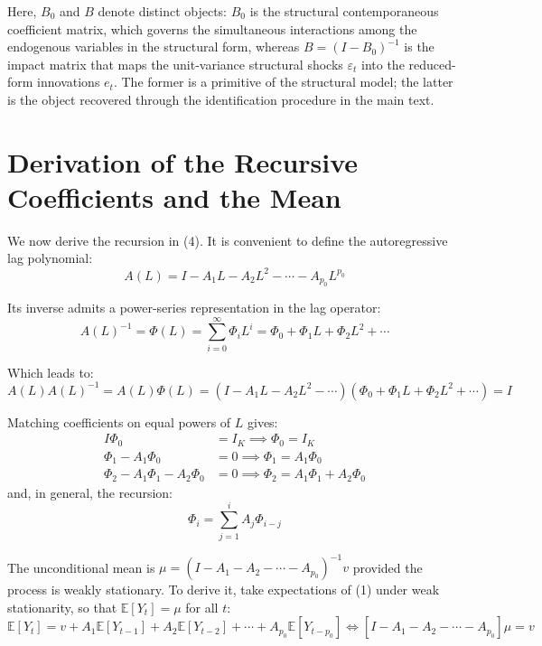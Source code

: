 \documentclass[12pt, a4paper]{article}
\begin{document}
Here, $B_0$ and $B$ denote distinct objects: $B_0$ is the structural contemporaneous coefficient matrix, which governs the simultaneous interactions among the endogenous variables in the structural form, whereas $B = (I-B_0)^{-1}$ is the impact matrix that maps the unit-variance structural shocks $\varepsilon_t$ into the reduced-form innovations $e_t$. The former is a primitive of the structural model; the latter is the object recovered through the identification procedure in the main text.

\section{Derivation of the Recursive Coefficients and the Mean}

We now derive the recursion in (4). It is convenient to define the autoregressive lag polynomial: 
\begin{equation}
A(L) = I - A_1L - A_2L^2 - \cdots - A_{p_0}L^{p_0}  
\end{equation}

Its inverse admits a power-series representation in the lag operator:
\begin{equation}
A(L)^{-1} = \Phi(L) = \sum_{i=0}^{\infty} \Phi_i L^{i} = \Phi_0 + \Phi_1L + \Phi_2L^2 + \cdots  
\end{equation}

Which leads to: 
\begin{equation}
A(L)A(L)^{-1} = A(L)\Phi(L) = (I - A_1L - A_2L^2 - \cdots)(\Phi_0 + \Phi_1L + \Phi_2L^2 + \cdots) = I  
\end{equation}

Matching coefficients on equal powers of $L$ gives: 
\begin{align*}
I\Phi_0 &= I_K \implies \Phi_0 = I_K \\
\Phi_1 - A_1\Phi_0 &= 0 \implies \Phi_1 = A_1\Phi_0 \\
\Phi_2 - A_1\Phi_1 - A_2\Phi_0 &= 0 \implies \Phi_2 = A_1\Phi_1 + A_2\Phi_0
\end{align*}
and, in general, the recursion: 
\begin{equation}
\Phi_i = \sum_{j=1}^{i} A_j\Phi_{i-j}  
\end{equation}

The unconditional mean is $\mu = (I-A_1-A_2-\cdots-A_{p_0})^{-1}v$ provided the process is weakly stationary. To derive it, take expectations of (1) under weak stationarity, so that $\mathbb{E}[Y_t] = \mu$ for all $t$:
\begin{equation}
\mathbb{E}[Y_t] = v + A_1\mathbb{E}[Y_{t-1}] + A_2\mathbb{E}[Y_{t-2}] + \cdots + A_{p_0}\mathbb{E}[Y_{t-p_0}] \iff [I-A_1-A_2-\cdots-A_{p_0}]\mu = v  
\end{equation}
\end{document}
